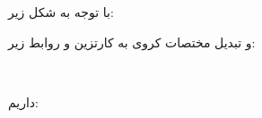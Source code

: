 \documentclass{article}
\begin{document}
\subsubsection{}
با توجه به شکل زیر:
\begin{figure}[H]%
	\centering
    \caption{\label{fig:formula210}}
\end{figure}
\noindent
و تبدیل مختصات کروی به کارتزین و روابط زیر:
\begin{figure}[H]%
	\centering
    \\
    \caption{\label{fig:formula211}}
\end{figure}
\noindent
داریم:
\begin{figure}[H]%
	\centering
    \caption{\label{fig:formula212}}
\end{figure}
\end{document}
